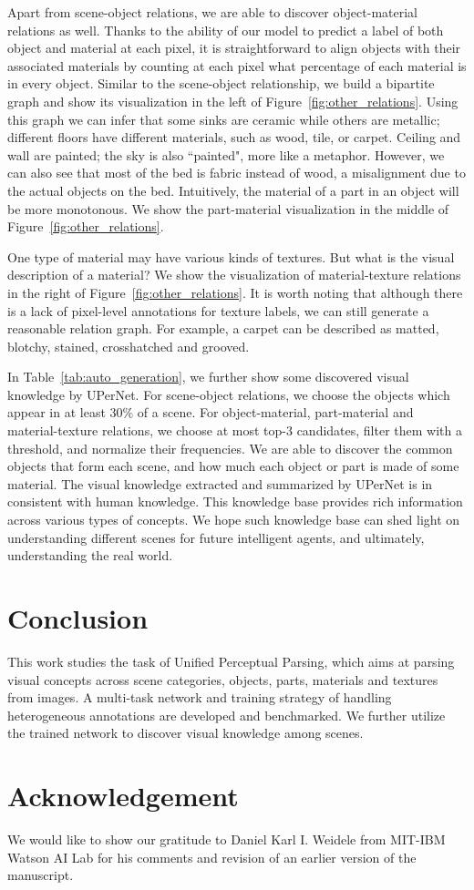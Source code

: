 \documentclass[runningheads]{llncs}
\begin{document}
 Apart from scene-object relations, we are able to discover object-material relations as well. Thanks to the ability of our model to predict a label of both object and material at each pixel, it is straightforward to align objects with their associated materials by counting at each pixel what percentage of each material is in every object. Similar to the scene-object relationship, we build a bipartite graph and show its visualization in the left of Figure~\ref{fig:other_relations}. Using this graph we can infer that some sinks are ceramic while others are metallic; different floors have different materials, such as wood, tile, or carpet. Ceiling and wall are painted; the sky is also ``painted", more like a metaphor. However, we can also see that most of the bed is fabric instead of wood, a misalignment due to the actual objects on the bed. Intuitively, the material of a part in an object will be more monotonous. We show the part-material visualization in the middle of Figure~\ref{fig:other_relations}. 

 One type of material may have various kinds of textures. But what is the visual description of a material? We show the visualization of material-texture relations in the right of Figure~\ref{fig:other_relations}. It is worth noting that although there is a lack of pixel-level annotations for texture labels, we can still generate a reasonable relation graph. For example, a carpet can be described as matted, blotchy, stained, crosshatched and grooved. 

In Table~\ref{tab:auto_generation}, we further show some discovered visual knowledge by UPerNet. For scene-object relations, we choose the objects which appear in at least $30\%$ of a scene. For object-material, part-material and material-texture relations, we choose at most top-3 candidates, filter them with a threshold, and normalize their frequencies. We are able to discover the common objects that form each scene, and how much each object or part is made of some material. The visual knowledge extracted and summarized by UPerNet is in consistent with human knowledge. This knowledge base provides rich information across various types of concepts. We hope such knowledge base can shed light on understanding different scenes for future intelligent agents, and ultimately, understanding the real world.

\section{Conclusion}
This work studies the task of Unified Perceptual Parsing, which aims at parsing visual concepts across scene categories, objects, parts, materials and textures from images. A multi-task network and training strategy of handling heterogeneous annotations are developed and benchmarked. We further utilize the trained network to discover visual knowledge among scenes. 

\section*{Acknowledgement}
We would like to show our gratitude to Daniel Karl I. Weidele from MIT-IBM Watson AI Lab for his comments and revision of an earlier version of the manuscript.



\end{document}
